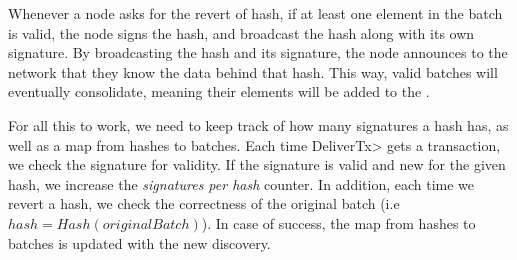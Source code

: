 %
Whenever a node asks for the revert of hash, if at least one element in the batch
is valid, the node signs the hash, and broadcast the hash along with its own signature.
%
By broadcasting the hash and its signature, the node announces to the network
that they know the data behind that hash.
%
This way, valid batches will eventually consolidate, meaning their elements will
be added to the \setchain.

For all this to work, we need to keep track of how many signatures a hash has,
as well as a map from hashes to batches.
%
Each time \<DeliverTx> gets a transaction, we check the
signature for validity.
%
If the signature is valid and new for the given hash, we increase the
\textit{signatures per hash} counter.
%
In addition, each time we revert a hash, we check the correctness of the
original batch (i.e $hash = Hash(originalBatch)$).
In case of success, the map from hashes to
batches is updated with the new discovery.

%


%




